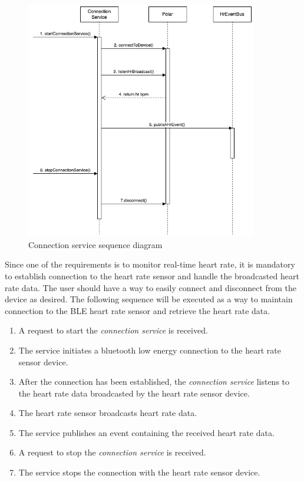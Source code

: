 \begin{figure}[H]
    \centering
    \includegraphics[width=0.9\textwidth]{diagrams/connection-service-onStart.drawio.png}
    \caption{Connection service sequence diagram}
    \label{fig:connection_diagram}
\end{figure}
Since one of the requirements is to monitor real-time heart rate, it is mandatory to establish connection to the heart rate sensor and handle the broadcasted heart rate data. The user should have a way to easily connect and disconnect from the device as desired.
The following sequence will be executed as a way to maintain connection to the BLE heart rate sensor and retrieve the heart rate data.
\begin{enumerate}
    \item A request to start the \emph{connection service} is received.
    \item The service initiates a bluetooth low energy connection to the heart rate sensor device.
    \item After the connection has been established, the \emph{connection service} listens to the heart rate data broadcasted by the heart rate sensor device.
    \item The heart rate sensor broadcasts heart rate data.
    \item The service publishes an event containing the received heart rate data.
    \item A request to stop the \emph{connection service} is received.
    \item The service stops the connection with the heart rate sensor device.
\end{enumerate}

